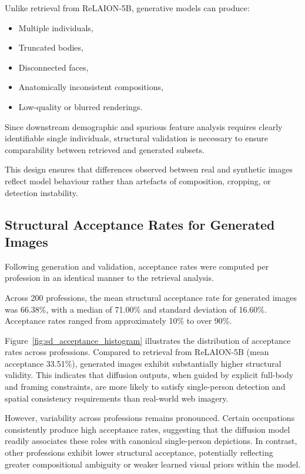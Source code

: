 Unlike retrieval from ReLAION-5B, generative models can produce:
\begin{itemize}
	\item Multiple individuals,
	\item Truncated bodies,
	\item Disconnected faces,
	\item Anatomically inconsistent compositions,
	\item Low-quality or blurred renderings.
\end{itemize}

Since downstream demographic and spurious feature analysis requires clearly identifiable single individuals, structural validation is necessary to ensure comparability between retrieved and generated subsets. 

This design ensures that differences observed between real and synthetic images reflect model behaviour rather than artefacts of composition, cropping, or detection instability.

\subsection{Structural Acceptance Rates for Generated Images}

Following generation and validation, acceptance rates were computed per profession in an identical manner to the retrieval analysis. 

Across 200 professions, the mean structural acceptance rate for generated images was 66.38\%, with a median of 71.00\% and standard deviation of 16.60\%. Acceptance rates ranged from approximately 10\% to over 90\%.

Figure~\ref{fig:sd_acceptance_histogram} illustrates the distribution of acceptance rates across professions. Compared to retrieval from ReLAION-5B (mean acceptance 33.51\%), generated images exhibit substantially higher structural validity. This indicates that diffusion outputs, when guided by explicit full-body and framing constraints, are more likely to satisfy single-person detection and spatial consistency requirements than real-world web imagery.

However, variability across professions remains pronounced. Certain occupations consistently produce high acceptance rates, suggesting that the diffusion model readily associates these roles with canonical single-person depictions. In contrast, other professions exhibit lower structural acceptance, potentially reflecting greater compositional ambiguity or weaker learned visual priors within the model.

